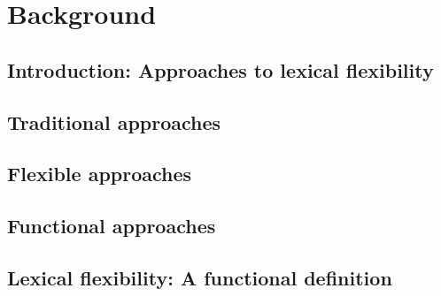\chapter{Background}
\label{ch:background}

\section{Introduction: Approaches to lexical flexibility}
\label{sec:2.1}

\section{Traditional approaches}
\label{sec:2.2}

\section{Flexible approaches}
\label{sec:2.3}

\section{Functional approaches}
\label{sec:2.4}

\section{Lexical flexibility: A functional definition}
\label{sec:2.5}
